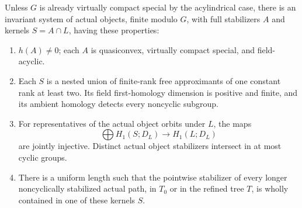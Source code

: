 \begin{proposition}\label{gate:capture}
Unless $G$ is already virtually compact special by the acylindrical case,
there is an invariant system of actual objects, finite modulo $G$, with
full stabilizers $A$ and kernels $S=A\cap L$, having these properties:
\begin{enumerate}[label=(\roman*)]
\item $h(A)\ne0$; each $A$ is quasiconvex, virtually compact special,
and field-acyclic.
\item Each $S$ is a nested union of finite-rank free approximants of one
constant rank at least two.  Its field first-homology dimension is positive
and finite, and its ambient homology detects every noncyclic subgroup.
\item For representatives of the actual object orbits under $L$, the maps
\[
 \bigoplus H_1(S;D_L)\longrightarrow H_1(L;D_L)
\]
are jointly injective.  Distinct actual object stabilizers intersect in
at most cyclic groups.
\item There is a uniform length such that the pointwise stabilizer of
every longer noncyclically stabilized actual path, in $T_0$ or in the
refined tree $T$, is wholly contained in one of these kernels $S$.
\end{enumerate}
\end{proposition}
